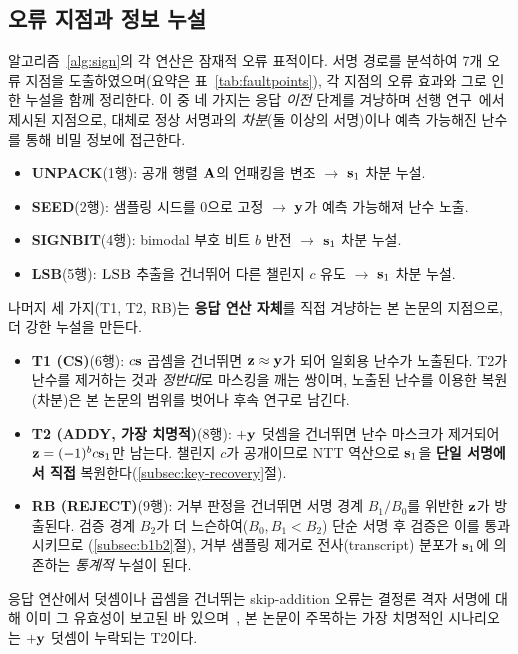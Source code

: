 \subsection{오류 지점과 정보 누설}
\label{subsec:faultpoints}
알고리즘~\ref{alg:sign}의 각 연산은 잠재적 오류 표적이다. 서명 경로를 분석하여 7개 오류 지점을
도출하였으며(요약은 표~\ref{tab:faultpoints}), 각 지점의 오류 효과와 그로 인한 누설을 함께 정리한다.
이 중 네 가지는 응답 \emph{이전} 단계를 겨냥하며 선행 연구~\cite{lee2026haetae}에서 제시된 지점으로,
대체로 정상 서명과의 \emph{차분}(둘 이상의 서명)이나 예측 가능해진 난수를 통해 비밀 정보에 접근한다.
\begin{itemize}
  \item \textbf{UNPACK}(1행): 공개 행렬 $\mathbf{A}$의 언패킹을 변조 $\to$ $\mathbf{s}_1$ 차분 누설.
  \item \textbf{SEED}(2행): 샘플링 시드를 0으로 고정 $\to$ $\mathbf{y}$가 예측 가능해져 난수 노출.
  \item \textbf{SIGNBIT}(4행): bimodal 부호 비트 $b$ 반전 $\to$ $\mathbf{s}_1$ 차분 누설.
  \item \textbf{LSB}(5행): $\textsc{LSB}$ 추출을 건너뛰어 다른 챌린지 $c$ 유도 $\to$ $\mathbf{s}_1$ 차분 누설.
\end{itemize}
나머지 세 가지(T1, T2, RB)는 \textbf{응답 연산 자체}를 직접 겨냥하는 본 논문의 지점으로, 더 강한 누설을
만든다.
\begin{itemize}
  \item \textbf{T1 (CS)}(6행): $c\mathbf{s}$ 곱셈을 건너뛰면 $\mathbf{z}\approx\mathbf{y}$가 되어 일회용 난수가 노출된다.
        T2가 난수를 제거하는 것과 \emph{정반대}로 마스킹을 깨는 쌍이며, 노출된 난수를 이용한 복원(차분)은
        본 논문의 범위를 벗어나 후속 연구로 남긴다.
  \item \textbf{T2 (ADDY, 가장 치명적)}(8행): $+\mathbf{y}$ 덧셈을 건너뛰면 난수 마스크가 제거되어
        $\mathbf{z}=(-1)^b c\mathbf{s}_1$만 남는다. 챌린지 $c$가 공개이므로 NTT 역산으로 $\mathbf{s}_1$을 \textbf{단일
        서명에서 직접} 복원한다(\ref{subsec:key-recovery}절).
  \item \textbf{RB (REJECT)}(9행): 거부 판정을 건너뛰면 서명 경계 $B_1/B_0$를 위반한 $\mathbf{z}$가 방출된다.
        검증 경계 $B_2$가 더 느슨하여($B_0,B_1<B_2$) 단순 서명 후 검증은 이를 통과시키므로
        (\ref{subsec:b1b2}절), 거부 샘플링 제거로 전사(transcript) 분포가 $\mathbf{s}_1$에 의존하는
        \emph{통계적} 누설이 된다.
\end{itemize}
응답 연산에서 덧셈이나 곱셈을 건너뛰는 skip-addition 오류는 결정론 격자 서명에 대해 이미 그 유효성이
보고된 바 있으며~\cite{ravi2019determinism}, 본 논문이 주목하는 가장 치명적인 시나리오는 $+\mathbf{y}$ 덧셈이
누락되는 T2이다.

